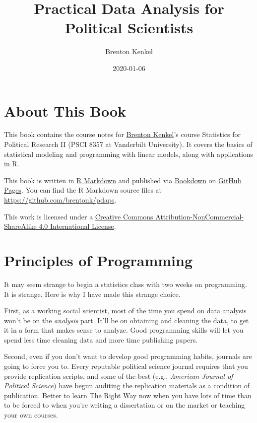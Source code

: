 \documentclass[
  12pt,
  oneside,openany]{book}
\title{Practical Data Analysis for Political Scientists}
\author{Brenton Kenkel}
\date{2020-01-06}
\begin{document}
\frontmatter
\maketitle

{
\setcounter{tocdepth}{1}
\tableofcontents
}
\mainmatter
\hypertarget{about-this-book}{%
\chapter{About This Book}\label{about-this-book}}

This book contains the course notes for \href{http://bkenkel.com}{Brenton Kenkel}'s course Statistics for Political Research II (PSCI 8357 at Vanderbilt University). It covers the basics of statistical modeling and programming with linear models, along with applications in R.

This book is written in \href{http://rmarkdown.rstudio.com}{R Markdown} and published via \href{https://bookdown.org}{Bookdown} on \href{https://pages.github.com}{GitHub Pages}. You can find the R Markdown source files at \url{https://github.com/brentonk/pdaps}.

This work is licensed under a \href{http://creativecommons.org/licenses/by-nc-sa/4.0/}{Creative Commons Attribution-NonCommercial-ShareAlike 4.0 International License}.

\hypertarget{programming}{%
\chapter{Principles of Programming}\label{programming}}

It may seem strange to begin a statistics class with two weeks on programming. It is strange. Here is why I have made this strange choice.

First, as a working social scientist, most of the time you spend on data analysis won't be on the \emph{analysis} part. It'll be on obtaining and cleaning the data, to get it in a form that makes sense to analyze. Good programming skills will let you spend less time cleaning data and more time publishing papers.

Second, even if you don't want to develop good programming habits, journals are going to force you to. Every reputable political science journal requires that you provide replication scripts, and some of the best (e.g., \emph{American Journal of Political Science}) have begun auditing the replication materials as a condition of publication. Better to learn The Right Way now when you have lots of time than to be forced to when you're writing a dissertation or on the market or teaching your own courses.
\end{document}
